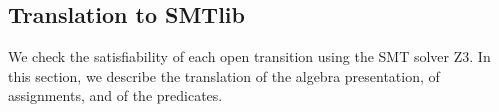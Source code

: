\documentclass[smallcondensed]{svjour3}
\newcommand{\noteInEM}[2][inline,color=green!40]{\todo[#1]{{\bf Eric: } {#2}}}
\newcommand{\ERIC}[1]{\textcolor{blue}{#1}}
\begin{document}
  


  


  




\subsection{Translation to SMTlib}
\label{section:TranslationToSMTlib}

We check the satisfiability of each open transition
using the SMT solver Z3.
In this
section, we describe the translation of the algebra presentation, of
assignments, and of the predicates.
\end{document}
